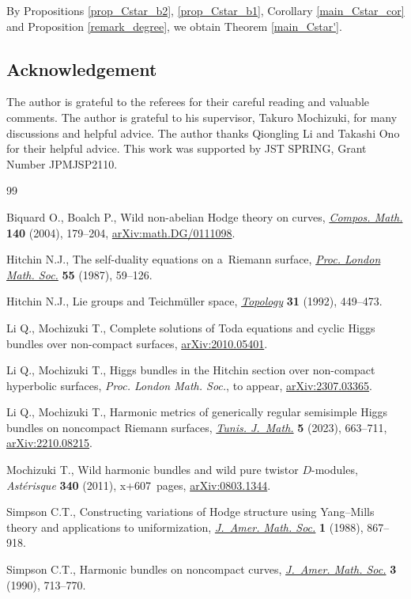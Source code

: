 \documentclass[pdftex]{sigma}
\numberwithin{equation}{section}
\begin{document}
By Propositions \ref{prop_Cstar_b2}, \ref{prop_Cstar_b1}, Corollary \ref{main_Cstar_cor} and Proposition \ref{remark_degree}, we obtain Theorem \ref{main_Cstar'}.

\subsection*{Acknowledgement}
The author is grateful to the referees for their careful reading and valuable comments.
The author is grateful to his supervisor, Takuro Mochizuki, for many discussions and helpful advice.
The author thanks Qiongling Li and Takashi Ono for their helpful advice.
This work was supported by JST SPRING, Grant Number JPMJSP2110.

\begin{thebibliography}{99}
\footnotesize\itemsep=0pt

Biquard O., Boalch P., Wild non-abelian {H}odge theory on curves,
 \href{https://doi.org/10.1112/S0010437X03000010}{\textit{Compos. Math.}} \textbf{140} (2004), 179--204,
 \href{https://arxiv.org/abs/math.DG/0111098}{arXiv:math.DG/0111098}.

Hitchin N.J., The self-duality equations on a~{R}iemann surface, \href{https://doi.org/10.1112/plms/s3-55.1.59}{\textit{Proc.
 London Math. Soc.}} \textbf{55} (1987), 59--126.

Hitchin N.J., Lie groups and {T}eichm\"uller space, \href{https://doi.org/10.1016/0040-9383(92)90044-I}{\textit{Topology}}
 \textbf{31} (1992), 449--473.

Li Q., Mochizuki T., Complete solutions of {T}oda equations and cyclic {H}iggs
 bundles over non-compact surfaces, \href{https://arxiv.org/abs/2010.05401}{arXiv:2010.05401}.

Li Q., Mochizuki T., Higgs bundles in the {H}itchin section over non-compact
 hyperbolic surfaces, \textit{Proc. London Math. Soc.}, {t}o appear,
 \href{https://arxiv.org/abs/2307.03365}{arXiv:2307.03365}.

Li Q., Mochizuki T., Harmonic metrics of generically regular semisimple {H}iggs
 bundles on noncompact {R}iemann surfaces, \href{https://doi.org/10.2140/tunis.2023.5.663}{\textit{Tunis. J.~Math.}} \textbf{5}
 (2023), 663--711, \href{https://arxiv.org/abs/2210.08215}{arXiv:2210.08215}.

Mochizuki T., Wild harmonic bundles and wild pure twistor {$D$}-modules,
 \textit{Ast\'erisque} \textbf{340} (2011), x+607~pages, \href{https://arxiv.org/abs/0803.1344}{arXiv:0803.1344}.

Simpson C.T., Constructing variations of {H}odge structure using
 {Y}ang--{M}ills theory and applications to uniformization, \href{https://doi.org/10.2307/1990994}{\textit{J.~Amer.
 Math. Soc.}} \textbf{1} (1988), 867--918.

Simpson C.T., Harmonic bundles on noncompact curves, \href{https://doi.org/10.2307/1990935}{\textit{J.~Amer. Math.
 Soc.}} \textbf{3} (1990), 713--770.

\end{thebibliography}\LastPageEnding
\end{document}
